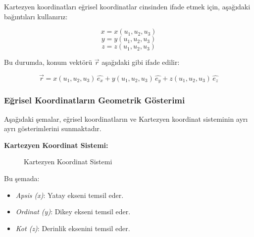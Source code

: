 \documentclass[11pt,letterpaper,twocolumn]{fenbil}
\begin{document}
Kartezyen koordinatları eğrisel koordinatlar cinsinden ifade etmek için, aşağıdaki bağıntıları kullanırız:

\begin{equation}
x = x(u_1, u_2, u_3)
\end{equation}
\begin{equation}
y = y(u_1, u_2, u_3)
\end{equation}
\begin{equation}
z = z(u_1, u_2, u_3)
\end{equation}

Bu durumda, konum vektörü $\vec{r}$ aşağıdaki gibi ifade edilir:

\begin{equation}
\vec{r} = x(u_1, u_2, u_3) \, \hat{e_x} + y(u_1, u_2, u_3) \, \hat{e_y} + z(u_1, u_2, u_3) \, \hat{e_z}
\end{equation}

\subsubsection{Eğrisel Koordinatların Geometrik Gösterimi}

Aşağıdaki şemalar, eğrisel koordinatların ve Kartezyen koordinat sisteminin ayrı ayrı gösterimlerini sunmaktadır.

\textbf{Kartezyen Koordinat Sistemi:}

\begin{figure}[htbp]
    \centering
    \caption{Kartezyen Koordinat Sistemi}
    \label{fig:kartezyen_koordinat}
\end{figure}

Bu şemada:

\begin{itemize}
    \item \textit{Apsis (x)}: Yatay ekseni temsil eder.
    \item \textit{Ordinat (y)}: Dikey ekseni temsil eder.
    \item \textit{Kot (z)}: Derinlik eksenini temsil eder.
\end{itemize}
\end{document}
